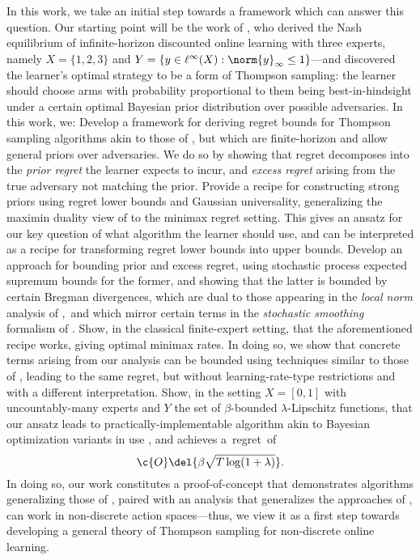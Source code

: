 \documentclass[preprint,12pt]{colt2025}
\begin{document}
In this work, we take an initial step towards a framework which can answer this question.
Our starting point will be the work of \textcite{gravin2016towards}, who derived the Nash equilibrium of infinite-horizon discounted online learning with three experts, namely $X = \{1,2,3\}$ and $Y = \{y \in \ell^\infty(X) : \norm{y}_\infty \leq 1\}$---and discovered the learner's optimal strategy to be a form of Thompson sampling: the learner should choose arms with probability proportional to them being best-in-hindsight under a certain optimal Bayesian prior distribution over possible adversaries.
In this work, we:
\1 Develop a framework for deriving regret bounds for Thompson sampling algorithms akin to those of \textcite{gravin2016towards}, but which are finite-horizon and allow general priors over adversaries. We do so by showing that regret decomposes into the \emph{prior regret} the learner expects to incur, and \emph{excess regret} arising from the true adversary not matching the prior.
\2 Provide a recipe for constructing strong priors using regret lower bounds and Gaussian universality, generalizing the maximin duality view of \textcite{gravin2016towards} to the minimax regret setting. This gives an ansatz for our key question of what algorithm the learner should use, and can be interpreted as a recipe for transforming regret lower bounds into upper bounds.
\3 Develop an approach for bounding prior and excess regret, using stochastic process expected supremum bounds for the former, and showing that the latter is bounded by certain Bregman divergences, which are dual to those appearing in the \emph{local norm} analysis of \textcite{orabona2019modern},~and which mirror certain terms in the \emph{stochastic smoothing} formalism of \textcite{abernethy2016perturbation}.
\4 Show, in the classical finite-expert setting, that the aforementioned recipe works, giving optimal minimax rates. In doing so, we show that concrete terms arising from our analysis can be bounded using techniques similar to those of \textcite{abernethy2016perturbation}, leading to the same regret, but without learning-rate-type restrictions and with a different interpretation.
\5 Show, in the setting $X = [0,1]$ with uncountably-many experts and $Y$ the set of $\beta$-bounded $\lambda$-Lipschitz functions, that our ansatz leads to practically-implementable algorithm akin to Bayesian optimization variants in use \cite{frazier18,garnett23}, and achieves a~regret~of
\[
\c{O}\del{\beta \sqrt{T\log(1+\lambda)}}
.
\] 
\0 
In doing so, our work constitutes a proof-of-concept that demonstrates algorithms generalizing those of \textcite{gravin2016towards}, paired with an analysis that generalizes the approaches of \textcite{abernethy2016perturbation,orabona2019modern}, can work in non-discrete action spaces---thus, we view it as a first step towards developing a general theory of Thompson sampling for non-discrete online learning. 
\end{document}
